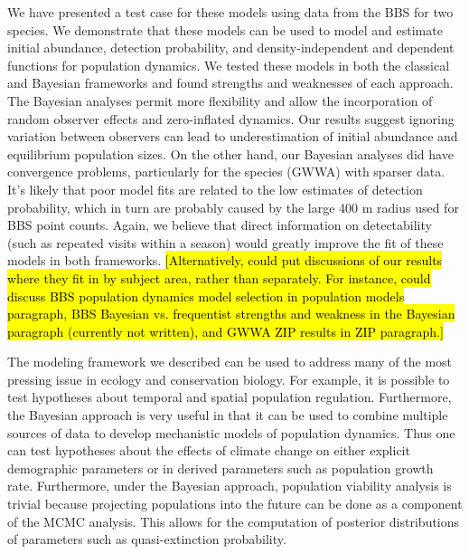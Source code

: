 \documentclass[12pt]{article}
\begin{document}
We have presented a test case for these models using data from
the BBS for two species. We demonstrate that these models can be
used to model and estimate initial abundance, detection
probability, and density-independent and dependent functions for
population dynamics. We tested these models in both the
classical and Bayesian frameworks and found strengths and
weaknesses of each approach. The Bayesian analyses permit more
flexibility and allow the incorporation of random observer
effects and zero-inflated dynamics. Our results suggest ignoring
variation between observers can lead to underestimation of
initial abundance and equilibrium population sizes. On the other
hand, our Bayesian analyses did have convergence problems,
particularly for the species (GWWA) with sparser data. It's
likely that poor model fits are related to the low estimates of
detection probability, which in turn are probably caused by the
large 400 m radius used for BBS point counts. Again, we believe
that direct information on detectability (such as repeated
visits within a season) would greatly improve the fit of these
models in both frameworks.
\hl{[Alternatively, could put discussions of our results where
they fit in by subject area, rather than separately. For
instance, could discuss BBS population dynamics model selection
in population models paragraph, BBS Bayesian vs.
frequentist strengths and weakness in the Bayesian paragraph
(currently not written), and GWWA ZIP results in ZIP paragraph.]}

The modeling framework we described can be used to address many of the
most pressing issue in ecology and conservation biology. For example,
it is possible to test hypotheses about temporal and spatial
population regulation. Furthermore, the Bayesian approach is very
useful in that it can be used to combine multiple sources of data to
develop mechanistic models of population dynamics. Thus one can test
hypotheses about the effects of climate change on either explicit
demographic parameters or in derived parameters such as population
growth rate. Furthermore, under the Bayesian approach, population
viability analysis is trivial because projecting populations into the
future can be done as a component of the MCMC analysis. This allows
for the computation of posterior distributions of parameters such as
quasi-extinction probability.





\newpage

\end{document}
